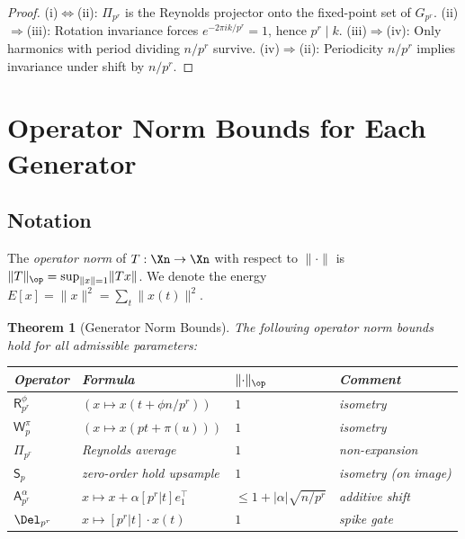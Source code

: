 \documentclass[11pt]{amsart}
\newtheorem{theorem}{Theorem}[section]
\newcommand{\Prj}{\Pi}
\newcommand{\Sp}{\mathsf{S}}
\newcommand{\Ap}{\mathsf{A}}
\newcommand{\Rp}{\mathsf{R}}
\newcommand{\Wp}{\mathsf{W}}
\newcommand{\norm}[1]{\lVert #1 \rVert}
\begin{document}
\begin{proof}
(i)$\Leftrightarrow$(ii): $\Prj_{p^r}$ is the Reynolds projector onto the fixed-point set of $G_{p^r}$.
(ii)$\Rightarrow$(iii): Rotation invariance forces $e^{-2\pi ik/p^r} = 1$, hence $p^r \mid k$.
(iii)$\Rightarrow$(iv): Only harmonics with period dividing $n/p^r$ survive.
(iv)$\Rightarrow$(ii): Periodicity $n/p^r$ implies invariance under shift by $n/p^r$.
\end{proof}

\section{Operator Norm Bounds for Each Generator}
\label{sec:op-norms}

\subsection{Notation}

The \emph{operator norm} of $T : \Xn \to \Xn$ with respect to $\norm{\cdot}$ is $\norm{T}_\op = \sup_{\norm{x}=1}\norm{Tx}$. We denote the energy $E[x] = \norm{x}^2 = \sum_t \norm{x(t)}^2$.

\begin{theorem}[Generator Norm Bounds]\label{thm:gen-norms}
The following operator norm bounds hold for all admissible parameters:
\begin{center}
\begin{tabular}{llll}
\toprule
Operator & Formula & $\norm{\cdot}_\op$ & Comment \\
\midrule
$\Rp_{p^r}^\phi$ & $(x \mapsto x(t + \phi n/p^r))$ & $1$ & isometry \\
$\Wp^\pi_p$ & $(x \mapsto x(pt + \pi(u)))$ & $1$ & isometry \\
$\Prj_{p^r}$ & Reynolds average & $1$ & non-expansion \\
$\Sp_p$ & zero-order hold upsample & $1$ & isometry (on image) \\
$\Ap^\alpha_{p^r}$ & $x \mapsto x + \alpha[p^r|t]e_1^\top$ & $\leq 1 + |\alpha|\sqrt{n/p^r}$ & additive shift \\
$\Del_{p^r}$ & $x \mapsto [p^r|t]\cdot x(t)$ & $1$ & spike gate \\
\bottomrule
\end{tabular}
\end{center}
\end{theorem}
\end{document}

